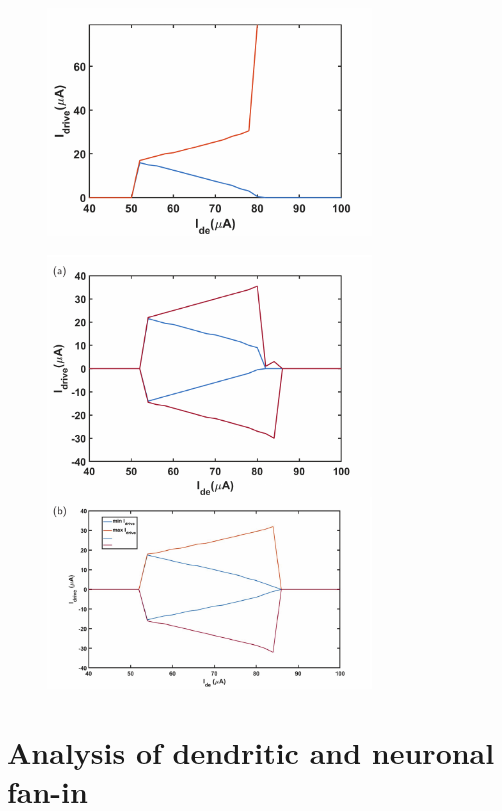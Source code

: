 \documentclass[twocolumn]{article}
\begin{document}
\begin{figure}[h!]
\includegraphics[width=8.6cm]{figures/_fig__dendrites__min_max__2jj.pdf}
\end{figure}

\begin{figure}[h!]
\includegraphics[width=8.6cm]{figures/_fig__dendrites__min_max__4jj.pdf}
\end{figure}

\section{\label{apx:fan_in}Analysis of dendritic and neuronal fan-in}
\end{document}

